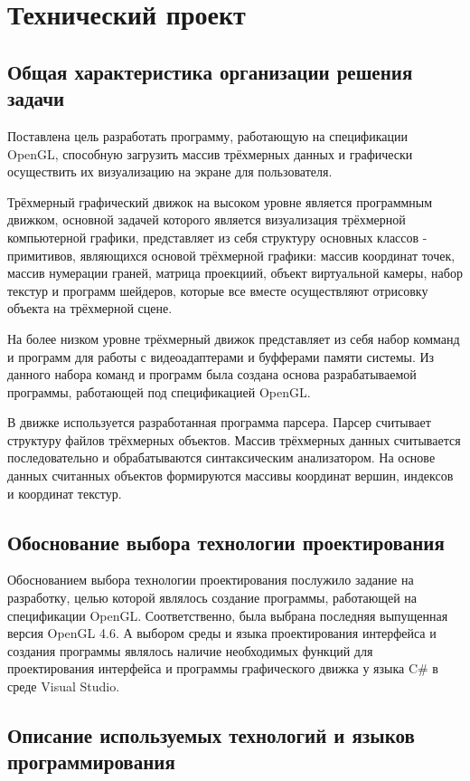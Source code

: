 \section{Технический проект}
\subsection{Общая характеристика организации решения задачи}

Поставлена цель разработать программу, работающую на спецификации OpenGL, способную загрузить массив трёхмерных данных и графически осуществить их визуализацию на экране для пользователя.

Трёхмерный графический движок на высоком уровне является программным движком, основной задачей которого является визуализация трёхмерной компьютерной графики, представляет из себя структуру основных классов - примитивов, являющихся основой трёхмерной графики: массив координат точек, массив нумерации граней, матрица проекциий, объект виртуальной камеры, набор текстур и программ шейдеров, которые все вместе осуществляют отрисовку объекта на трёхмерной сцене.

На более низком уровне трёхмерный движок представляет из себя набор комманд и программ для работы с видеоадаптерами и буфферами памяти системы. Из данного набора команд и программ была создана основа разрабатываемой программы, работающей под спецификацией OpenGL.

В движке используется разработанная программа парсера. Парсер считывает структуру файлов трёхмерных объектов. Массив трёхмерных данных считывается последовательно и обрабатываются синтаксическим анализатором. На основе данных считанных объектов формируются массивы координат вершин, индексов и координат текстур.
\subsection{Обоснование выбора технологии проектирования}

Обоснованием выбора технологии проектирования послужило задание на разработку, целью которой являлось создание программы, работающей на спецификации OpenGL. Соответственно, была выбрана последняя выпущенная версия OpenGL 4.6. А выбором среды и языка проектирования интерфейса и создания программы являлось наличие необходимых функций для проектирования интерфейса и программы графического движка у языка C\# в среде Visual Studio.

\subsection{Описание используемых технологий и языков программирования}

